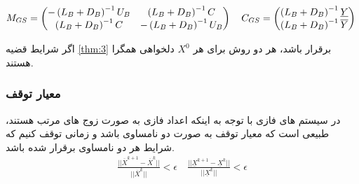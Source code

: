  	$ 
 	M_{GS} = 
 	\begin{pmatrix}
 	- \left(L_B + D_B\right)^{-1}U_B & \left(L_B + D_B\right)^{-1}C \\ 
    \left(L_B + D_B\right)^{-1}C & - \left(L_B + D_B\right)^{-1}U_B
 	\end{pmatrix}
 	\quad
 	C_{GS} = 
 	\begin{pmatrix}
 	\left(L_B + D_B\right)^{-1}\underline{Y}\\
 	\left(L_B + D_B\right)^{-1}\overline{Y}
 	\end{pmatrix} \\ 	
 	$	
 	
 	اگر شرایط قضیه \ref{thm:3} برقرار باشد، هر دو روش برای هر $ X^0 $ دلخواهی همگرا هستند.
 	
 	\subsubsection{معیار توقف}
 	در سیستم های فازی با توجه به اینکه اعداد فازی به صورت زوج های مرتب هستند،‌ طبیعی است که معیار توقف به صورت دو نامساوی باشد و زمانی توقف کنیم که شرایط هر دو نامساوی برقرار شده باشد. 
 	\begin{align}
 	\frac{||\overline{X}^{k+1} - \overline{X}^k||}{||\overline{X}^k||} < \epsilon 
 	\quad 
 	\frac{||\underline{X}^{k+1} - \underline{X}^k||}{||\underline{X}^k||} < \epsilon 
 	\end{align}
 	
	